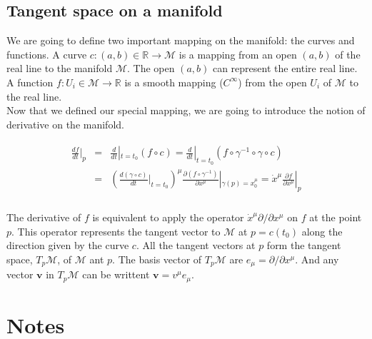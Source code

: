 \documentclass[final, paper=letter,5p,times,twocolumn]{elsarticle}
\theoremstyle{definition}
\begin{document}
\subsection{Tangent space on a manifold}

We are going to define two important mapping on the manifold: the curves and functions. A curve $c: (a,b) \in \mathbb{R} \rightarrow \mathcal{M}$ is a mapping from an open $(a,b)$ of the real line to the manifold $\mathcal{M}$. The open $(a,b)$ can represent the entire real line. A function $f: U_{i} \in \mathcal{M} \rightarrow \mathbb{R}$ is a smooth mapping ($C^{\infty}$) from the open $U_{i}$ of $\mathcal{M}$ to the real line.\\
Now that we defined our special mapping, we are going to introduce the notion of derivative on the manifold.

\begin{eqnarray*}
\begin{array}{rcl}
  \frac{df}{dt} |_{p} & = & \frac{d}{dt}|_{t = t_{0}} (f \circ c) = \frac{d}{dt}|_{t = t_{0}} (f \circ \gamma^{-1} \circ \gamma \circ c)\\
  & = &  \left(\frac{d(\gamma \circ c)}{dt}|_{t = t_{0}}\right)^{\mu}\frac{\partial (f \circ \gamma^{-1})}{\partial x^{\mu}}|_{\gamma(p) = x_{0}^{\mu}} = \dot{x}^{\mu}\frac{\partial f }{\partial x^{\mu}}|_{p}\\
\end{array}
\end{eqnarray*}

The derivative of $f$ is equivalent to apply the operator $\dot{x}^{\mu}\partial / \partial x^{\mu}$ on $f$ at the point $p$. This operator represents the tangent vector to $\mathcal{M}$ at $p = c(t_{0})$ along the direction given by the curve $c$. All the tangent vectors at $p$ form the tangent space, $T_{p}\mathcal{M}$, of $\mathcal{M}$ ant $p$. The basis vector of $T_{p}\mathcal{M}$ are $e_{\mu} = \partial / \partial x^{\mu}$. And any vector $\bm{v}$ in $T_{p}\mathcal{M}$ can be writtent $\bm{v} = v^{\mu} e_{\mu}$. \\


\section{Notes}
\end{document}
